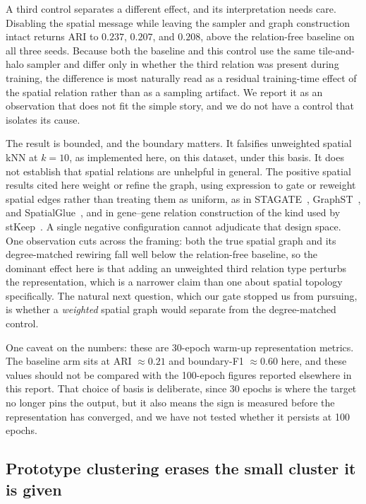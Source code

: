 \documentclass[twocolumn,10pt]{article}
\begin{document}
A third control separates a different effect, and its interpretation needs care. Disabling the spatial message while leaving the sampler and graph construction intact returns ARI to $0.237$, $0.207$, and $0.208$, above the relation-free baseline on all three seeds. Because both the baseline and this control use the same tile-and-halo sampler and differ only in whether the third relation was present during training, the difference is most naturally read as a residual training-time effect of the spatial relation rather than as a sampling artifact. We report it as an observation that does not fit the simple story, and we do not have a control that isolates its cause.

The result is bounded, and the boundary matters. It falsifies unweighted spatial kNN at $k=10$, as implemented here, on this dataset, under this basis. It does not establish that spatial relations are unhelpful in general. The positive spatial results cited here weight or refine the graph, using expression to gate or reweight spatial edges rather than treating them as uniform, as in STAGATE~\cite{stagate}, GraphST~\cite{graphst}, and SpatialGlue~\cite{spatialglue}, and in gene--gene relation construction of the kind used by stKeep~\cite{stkeep}. A single negative configuration cannot adjudicate that design space. One observation cuts across the framing: both the true spatial graph and its degree-matched rewiring fall well below the relation-free baseline, so the dominant effect here is that adding an unweighted third relation type perturbs the representation, which is a narrower claim than one about spatial topology specifically. The natural next question, which our gate stopped us from pursuing, is whether a \emph{weighted} spatial graph would separate from the degree-matched control.

One caveat on the numbers: these are 30-epoch warm-up representation metrics. The baseline arm sits at ARI $\approx 0.21$ and boundary-F1 $\approx 0.60$ here, and these values should not be compared with the 100-epoch figures reported elsewhere in this report. That choice of basis is deliberate, since 30 epochs is where the target no longer pins the output, but it also means the sign is measured before the representation has converged, and we have not tested whether it persists at 100 epochs.

\subsection{Prototype clustering erases the small cluster it is given}
\label{sec:prototype}
\end{document}
